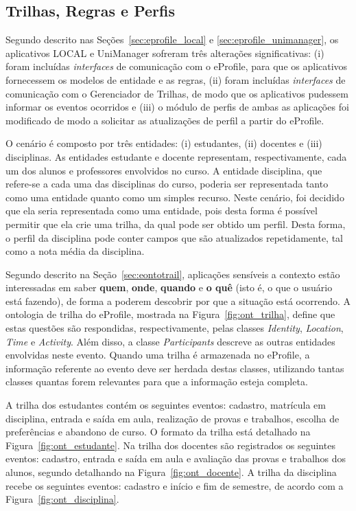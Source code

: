 
\subsection{Trilhas, Regras e Perfis}
\label{sec:trilhas_cen1}

Segundo descrito nas Seções~\ref{sec:eprofile_local} e \ref{sec:eprofile_unimanager}, os aplicativos LOCAL e UniManager sofreram três alterações significativas: (i) foram incluídas {\em interfaces} de comunicação com o eProfile, para que os aplicativos fornecessem os modelos de entidade e as regras, (ii) foram incluídas {\em interfaces} de comunicação com o Gerenciador de Trilhas, de modo que os aplicativos pudessem informar os eventos ocorridos e (iii) o módulo de perfis de ambas as aplicações foi modificado de modo a solicitar as atualizações de perfil a partir do eProfile.

O cenário é composto por três entidades: (i) estudantes, (ii) docentes e (iii) disciplinas. As entidades estudante e docente representam, respectivamente, cada um dos alunos e professores envolvidos no curso. A entidade disciplina, que refere-se a cada uma das disciplinas do curso, poderia ser representada tanto como uma entidade quanto como um simples recurso. Neste cenário, foi decidido que ela seria representada como uma entidade, pois desta forma é possível permitir que ela crie uma trilha, da qual pode ser obtido um perfil. Desta forma, o perfil da disciplina pode conter campos que são atualizados repetidamente, tal como a nota média da disciplina.

Segundo descrito na Seção~\ref{sec:eontotrail}, aplicações sensíveis a contexto estão interessadas em saber {\bf quem}, {\bf onde}, {\bf quando} e {\bf o quê} (isto é, o que o usuário está fazendo), de forma a poderem descobrir por que a situação está ocorrendo. A ontologia de trilha do eProfile, mostrada na Figura~\ref{fig:ont_trilha}, define que estas questões são respondidas, respectivamente, pelas classes {\em Identity}, {\em Location}, {\em Time} e {\em Activity}. Além disso, a classe {\em Participants} descreve as outras entidades envolvidas neste evento. Quando uma trilha é armazenada no eProfile, a informação referente ao evento deve ser herdada destas classes, utilizando tantas classes quantas forem relevantes para que a informação esteja completa.

A trilha dos estudantes contém os seguintes eventos: cadastro, matrícula em disciplina, entrada e saída em aula, realização de provas e trabalhos, escolha de preferências e abandono de curso. O formato da trilha está detalhado na Figura~\ref{fig:ont_estudante}. Na trilha dos docentes são registrados os seguintes eventos: cadastro, entrada e saída em aula e avaliação das provas e trabalhos dos alunos, segundo detalhando na Figura~\ref{fig:ont_docente}. A trilha da disciplina recebe os seguintes eventos: cadastro e início e fim de semestre, de acordo com a Figura~\ref{fig:ont_disciplina}.


